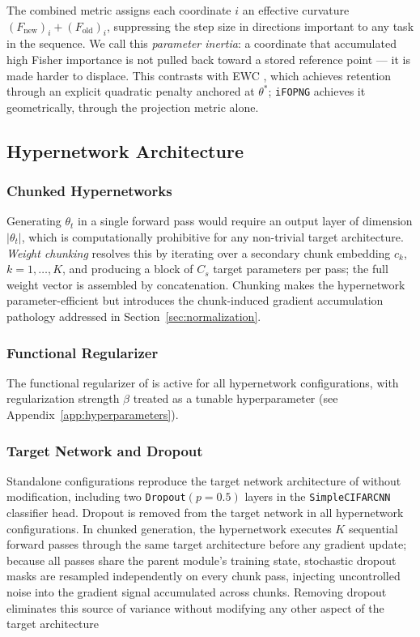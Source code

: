 The combined metric assigns each coordinate $i$ an effective curvature
$(F_{\mathrm{new}})_i + (F_{\mathrm{old}})_i$, suppressing the step size
in directions important to any task in the sequence.
We call this \emph{parameter inertia}: a coordinate that accumulated high
Fisher importance is not pulled back toward a stored reference point ---
it is made harder to displace.
This contrasts with EWC \citep{kirkpatrick_overcoming_2017}, which achieves
retention through an explicit quadratic penalty anchored at $\theta^*$;
\texttt{iFOPNG} achieves it geometrically, through the projection metric alone.

\subsection{Hypernetwork Architecture}
\label{sec:hn_arch}

\subsubsection{Chunked Hypernetworks}
Generating $\theta_t$ in a single forward pass would require an output
layer of dimension $|\theta_t|$, which is computationally prohibitive for
any non-trivial target architecture.
\emph{Weight chunking} \citep{oswald_continual_2020} resolves this by
iterating over a secondary chunk embedding $c_k$, $k=1,\ldots,K$,
and producing a block of $C_s$ target parameters per pass; the full weight
vector is assembled by concatenation.
Chunking makes the hypernetwork parameter-efficient but introduces the
chunk-induced gradient accumulation pathology addressed in
Section~\ref{sec:normalization}.

\subsubsection{Functional Regularizer}
The functional regularizer of \citet{oswald_continual_2020} is active for
all hypernetwork configurations, with regularization strength $\beta$ treated
as a tunable hyperparameter (see Appendix~\ref{app:hyperparameters}).

\subsubsection{Target Network and Dropout}
\label{sec:dropout}
Standalone configurations reproduce the target network architecture of
\citet{garg_fisher-orthogonal_2026} without modification, including two
\texttt{Dropout}$(p{=}0.5)$ layers in the \texttt{SimpleCIFARCNN} classifier
head.
Dropout is removed from the target network in all hypernetwork configurations.
In chunked generation, the hypernetwork executes $K$ sequential forward
passes through the same target architecture before any gradient update;
because all passes share the parent module's training state, stochastic
dropout masks are resampled independently on every chunk pass, injecting
uncontrolled noise into the gradient signal accumulated across chunks.
Removing dropout eliminates this source of variance without modifying
any other aspect of the target architecture
